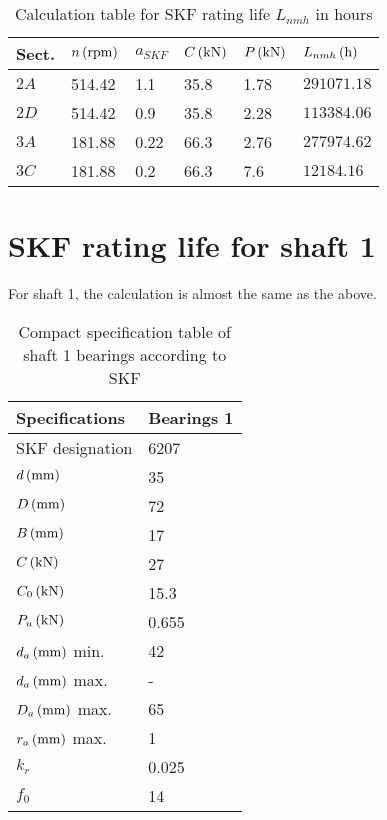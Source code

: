 \begin{table}[ht]
	\centering
	\caption{Calculation table for SKF rating life $ L_{nmh} $ in hours}
	\begin{tabular}{llllll}\toprule
		Sect. & $ n \, (\mathrm{rpm}) $ & $ a_{SKF} $ & $ C \, (\mathrm{kN}) $ & $ P \, (\mathrm{kN}) $ & $ L_{nmh} \, (\mathrm{h}) $ \\ \midrule
		$ 2A $ & 514.42 & 1.1  & 35.8 & 1.78 & $ 291071.18 $ \\
		$ 2D $ & 514.42 & 0.9  & 35.8 & 2.28 & $ 113384.06 $ \\
		$ 3A $ & 181.88 & 0.22 & 66.3 & 2.76 & $ 277974.62 $ \\
		$ 3C $ & 181.88 & 0.2  & 66.3 & 7.6 & $ 12184.16 $ \\
		\bottomrule
	\end{tabular}
	\label{ratinglife}
\end{table}

\section{SKF rating life for shaft 1}
For shaft 1, the calculation is almost the same as the above.

\begin{table}[ht]
	\centering
	\caption{Compact specification table of shaft 1 bearings according to SKF \cite{rolling_bearings}}
	\begin{tabular}{ll}\toprule
		Specifications & Bearings 1 \\\midrule
		SKF designation & 6207 \\
		$ d \, (\mathrm{mm}) $ & 35\\
		$ D \, (\mathrm{mm}) $ & 72\\
		$ B \, (\mathrm{mm}) $ & 17\\
		$ C \, (\mathrm{kN}) $ & 27\\
		$ C_0 \, (\mathrm{kN}) $ & 15.3\\
		$ P_u \, (\mathrm{kN}) $ & 0.655\\
		$ d_a \, (\mathrm{mm}) $ min. & 42 \\
		$ d_a \, (\mathrm{mm}) $ max. & - \\
		$ D_a \, (\mathrm{mm}) $ max. & 65 \\
		$ r_a \, (\mathrm{mm}) $ max. & 1 \\
		$ k_r $ & 0.025\\
		$ f_0 $ & 14\\
		\bottomrule
	\end{tabular}
	\label{bearingspecs2}
\end{table}

